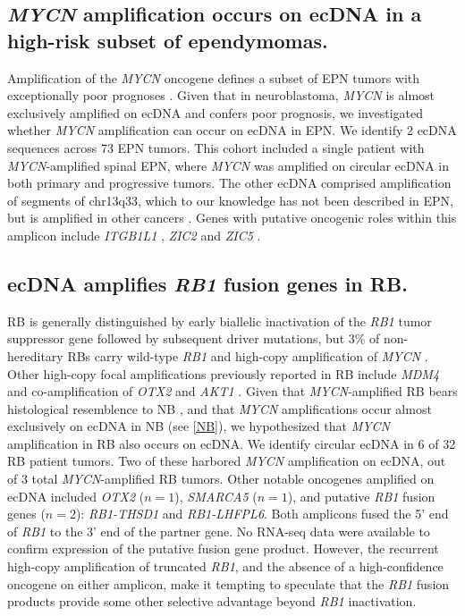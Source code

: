 \subsection{\textit{MYCN} amplification occurs on ecDNA in a high-risk subset of ependymomas.}
Amplification of the \textit{MYCN} oncogene defines a subset of \gls{EPN} tumors with exceptionally poor prognoses \cite{ghasemi_2019}. Given that in neuroblastoma, \textit{MYCN} is almost exclusively amplified on ecDNA and confers poor prognosis, we investigated whether \textit{MYCN} amplification can occur on ecDNA in \gls{EPN}. We identify 2 ecDNA sequences across 73 \gls{EPN} tumors. This cohort included a single patient with \textit{MYCN}-amplified spinal \gls{EPN}, where \textit{MYCN} was amplified on circular ecDNA in both primary and progressive tumors. The other ecDNA comprised amplification of segments of chr13q33, which to our knowledge has not been described in \gls{EPN}, but is amplified in other cancers \cite{knuutila_1998}. Genes with putative oncogenic roles within this amplicon include \textit{ITGB1L1} \cite{wang_2022}, \textit{ZIC2} \cite{liu_2022} and \textit{ZIC5} \cite{tan_2022, song_2022}.

\subsection{ecDNA amplifies \textit{RB1} fusion genes in RB.}
\Gls{RB} is generally distinguished by early biallelic inactivation of the \textit{RB1} tumor suppressor gene followed by subsequent driver mutations, but 3\% of non-hereditary \glspl{RB} carry wild-type \textit{RB1} and high-copy amplification of \textit{MYCN} \cite{rushlow_2013}. Other high-copy focal amplifications previously reported in \gls{RB} include \textit{MDM4} and co-amplification of \textit{OTX2} and \textit{AKT1} \cite{sakai_1985}. Given that \textit{MYCN}-amplified \gls{RB} bears histological resemblence to \gls{NB} \cite{rushlow_2013}, and that \textit{MYCN} amplifications occur almost exclusively on ecDNA in \gls{NB} (see \ref{NB}), we hypothesized that \textit{MYCN} amplification in \gls{RB} also occurs on ecDNA. We identify circular ecDNA in 6 of 32 \gls{RB} patient tumors. Two of these harbored \textit{MYCN} amplification on ecDNA, out of 3 total \textit{MYCN}-amplified \gls{RB} tumors. Other notable oncogenes amplified on ecDNA included \textit{OTX2} ($n=1$), \textit{SMARCA5} ($n=1$), and putative \textit{RB1} fusion genes ($n=2$): \textit{RB1-THSD1} and \textit{RB1-LHFPL6}. Both amplicons fused the 5' end of \textit{RB1} to the 3' end of the partner gene. No RNA-seq data were available to confirm expression of the putative fusion gene product. However, the recurrent high-copy amplification of truncated \textit{RB1}, and the absence of a high-confidence oncogene on either amplicon, make it tempting to speculate that the \textit{RB1} fusion products provide some other selective advantage beyond \textit{RB1} inactivation.

